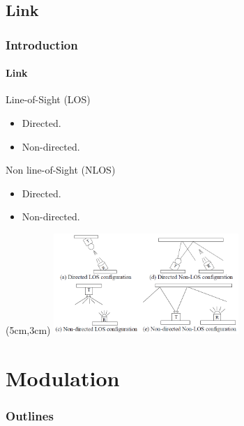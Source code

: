 \documentclass[mathserif]{beamer}
\newcommand{\wait}{\vfill}
\begin{document}
\subsection{Link}
\begin{frame}
\frametitle{Introduction}
\framesubtitle{Link}
	Line-of-Sight (LOS)
	\begin{itemize}
		\item Directed.
		\item Non-directed.
	\end{itemize}

	\wait
	Non line-of-Sight (NLOS)
	\begin{itemize}
		\item Directed.
		\item Non-directed.
	\end{itemize}

	\begin{textblock*}{7cm}(5cm,3cm) %
		\includegraphics[width=7cm]{figuras/link.png}
	\end{textblock*}
\end{frame}	



\section{Modulation}
\begin{frame}
\frametitle{Outlines}
	\small
	\tableofcontents[currentsection]
\end{frame}
\end{document}
